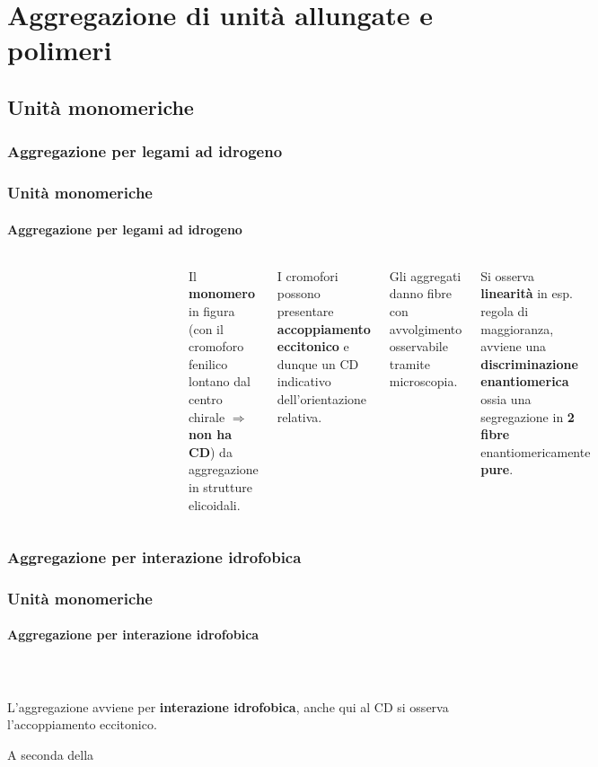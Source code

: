 \section{Aggregazione di unità allungate e polimeri}
\subsection{Unità monomeriche}\subsubsection{Aggregazione per legami ad idrogeno}\begin{frame}\frametitle{Unità monomeriche}\framesubtitle{Aggregazione per legami ad idrogeno}
\begin{columns}
  \vspace{-5pt}  \begin{figure}{}\end{figure}\vspace{-10pt}\begin{figure}{}\end{figure}
Il \textbf{monomero} in figura (con il cromoforo fenilico lontano dal centro chirale $\Rightarrow$ \textbf{non ha CD}) da aggregazione in strutture elicoidali.

I cromofori possono presentare \textbf{accoppiamento eccitonico} e dunque un CD indicativo dell'orientazione relativa. 

Gli aggregati danno fibre con avvolgimento osservabile tramite microscopia.

Si osserva \textbf{linearità} in esp. regola di maggioranza, avviene una \textbf{discriminazione enantiomerica} ossia una segregazione in \textbf{2 fibre} enantiomericamente \textbf{pure}. \cite{4}
\end{columns}
  \end{frame} 

\subsubsection{Aggregazione per interazione idrofobica}\begin{frame}\frametitle{Unità monomeriche}\framesubtitle{Aggregazione per interazione idrofobica}
\vspace{-5pt}\begin{columns}
\begin{figure}{}\end{figure}\begin{figure}{}\end{figure}\end{columns}
\vspace{10pt}
L'aggregazione avviene per \textbf{interazione idrofobica}, anche qui al CD si osserva l'accoppiamento eccitonico. 

A seconda della 
\end{frame}
